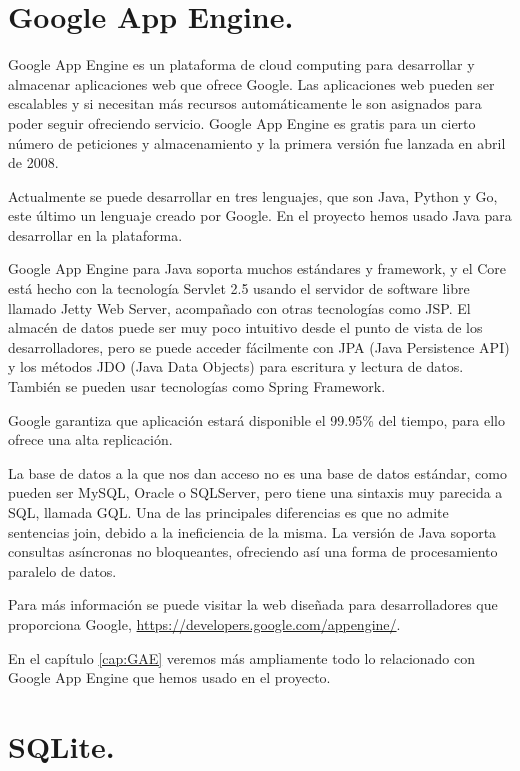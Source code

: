 \section{Google App Engine.}

Google App Engine es un plataforma de cloud computing para desarrollar y almacenar aplicaciones web que ofrece Google. Las aplicaciones web pueden ser escalables y si necesitan más recursos automáticamente le son asignados para poder seguir ofreciendo servicio. Google App Engine es gratis para un cierto número de peticiones y almacenamiento y la primera versión fue lanzada en abril de 2008.

Actualmente se puede desarrollar en tres lenguajes, que son Java, Python y Go, este último un lenguaje creado por Google. En el proyecto hemos usado Java para desarrollar en la plataforma. 

Google App Engine para Java soporta muchos estándares y framework, y el Core está hecho con la tecnología Servlet 2.5 usando el servidor de software libre llamado Jetty Web Server, acompañado con otras tecnologías como JSP. El almacén de datos puede ser muy poco intuitivo desde el punto de vista de los desarrolladores, pero se puede acceder fácilmente con JPA (Java Persistence API) y los métodos JDO (Java Data Objects) para escritura y lectura de datos. También se pueden usar tecnologías como Spring Framework.

Google garantiza que aplicación estará disponible el 99.95\% del tiempo, para ello ofrece una alta replicación.

La base de datos a la que nos dan acceso no es una base de datos estándar, como pueden ser MySQL, Oracle o SQLServer, pero tiene una sintaxis muy parecida a SQL, llamada GQL. Una de las principales diferencias es que no admite sentencias join, debido a la ineficiencia de la misma. La versión de Java soporta consultas asíncronas no bloqueantes, ofreciendo así una forma de procesamiento paralelo de datos.

Para más información se puede visitar la web diseñada para desarrolladores que proporciona Google, \url{https://developers.google.com/appengine/}. 

En el capítulo \ref{cap:GAE} veremos más ampliamente todo lo relacionado con Google App Engine que hemos usado en el proyecto.

\section{SQLite.}

